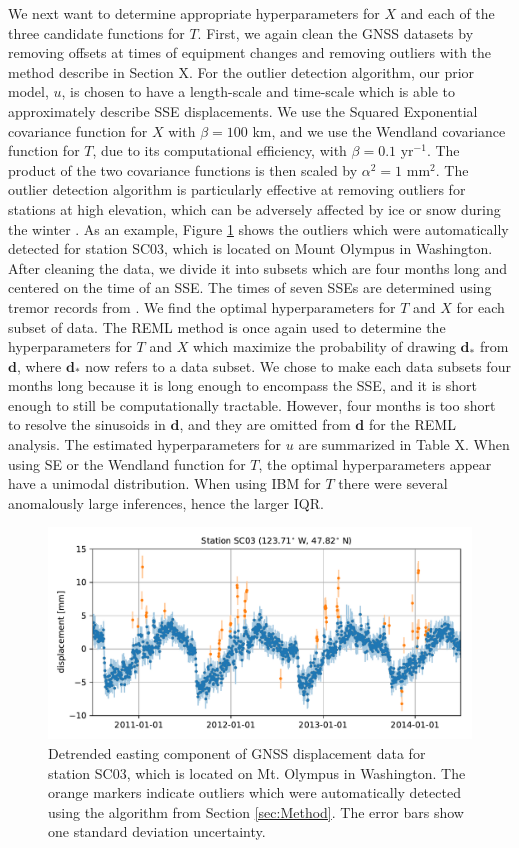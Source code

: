 \documentclass[10pt,a4paper]{article}
\begin{document}
We next want to determine appropriate hyperparameters for $X$ and each of the three candidate functions for $T$. First, we again clean the GNSS datasets by removing offsets at times of equipment changes and removing outliers with the method describe in Section X. For the outlier detection algorithm, our prior model, $u$, is chosen to have a length-scale and time-scale which is able to approximately describe SSE displacements. We use the Squared Exponential covariance function for $X$ with $\beta = 100$ km, and we use the Wendland covariance function for $T$, due to its computational efficiency, with $\beta = 0.1$ yr$^{-1}$. The product of the two covariance functions is then scaled by $\alpha^2 = 1$ mm$^{2}$. The outlier detection algorithm is particularly effective at removing outliers for stations at high elevation, which can be adversely affected by ice or snow during the winter \citep{Lisowski2008}. As an example, Figure \ref{fig:Outliers} shows the outliers which were automatically detected for station SC03, which is located on Mount Olympus in Washington.  After cleaning the data, we divide it into subsets which are four months long and centered on the time of an SSE. The times of seven SSEs are determined using tremor records from \cite{Wech2010}. We find the optimal hyperparameters for $T$ and $X$ for each subset of data. The REML method is once again used to determine the hyperparameters for $T$ and $X$ which maximize the probability of drawing $\bm{d}_*$ from $\bm{d}$, where $\bm{d}_*$ now refers to a data subset. We chose to make each data subsets four months long because it is long enough to encompass the SSE, and it is short enough to still be computationally tractable. However, four months is too short to resolve the sinusoids in $\bm{d}$, and they are omitted from $\bm{d}$ for the REML analysis. The estimated hyperparameters for $u$ are summarized in Table X. When using SE or the Wendland function for $T$, the optimal hyperparameters appear have a unimodal distribution. When using IBM for $T$ there were several anomalously large inferences, hence the larger IQR.   

\begin{figure}
\includegraphics{figures/outliers/outliers.pdf}
\caption{Detrended easting component of GNSS displacement data for station SC03, which is located on Mt. Olympus in Washington.  The orange markers indicate outliers which were automatically detected using the algorithm from Section \ref{sec:Method}. The error bars show one standard deviation uncertainty.}   
\label{fig:Outliers}
\end{figure}
\end{document}
